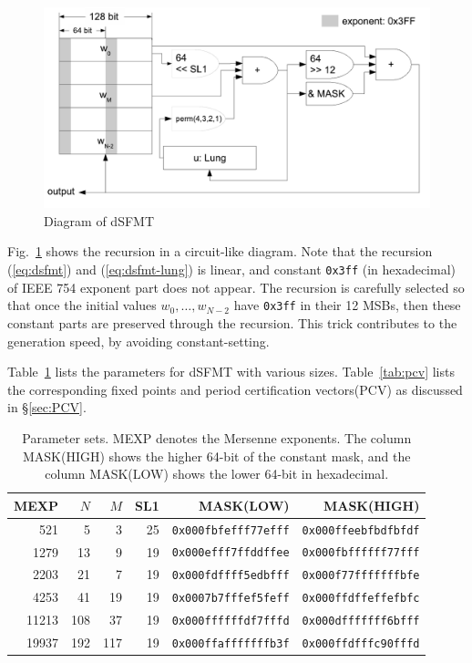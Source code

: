 \documentclass{svmult}
\begin{document}
\begin{figure}
  \centering
  \includegraphics[width=\linewidth]{Saito-fig.pdf}
  \caption{Diagram of dSFMT}
  \label{fig:dsfmt}
\end{figure}

Fig.~\ref{fig:dsfmt} shows the recursion in a circuit-like diagram.
Note that the recursion (\ref{eq:dsfmt}) and (\ref{eq:dsfmt-lung})
is linear, and constant \texttt{0x3ff} (in hexadecimal) of IEEE 754 exponent part
does not appear.
The recursion is carefully selected so that once
the initial values $w_0,\ldots , w_{N-2}$ have \texttt{0x3ff} in their 12 MSBs,
then these constant parts are preserved through the recursion. 
This trick contributes to the generation speed, by avoiding
constant-setting.

Table~\ref{tab:params} lists the parameters 
for dSFMT with various sizes.
Table~\ref{tab:pcv} lists the corresponding fixed points and period
certification vectors(PCV) as discussed in \S\ref{sec:PCV}.

\begin{table}
  \begin{center}
    \caption{Parameter sets. MEXP denotes the Mersenne exponents.
      The column MASK(HIGH) shows the higher
      64-bit of the constant mask, and the column MASK(LOW) shows
      the lower 64-bit in hexadecimal.}
    \label{tab:params}
    \begin{tabular}{rrrrrr} \hline
      MEXP & $N$ & $M$ & SL1 & MASK(LOW) & MASK(HIGH) \\ \hline \hline
      521 & 5 & 3 & 25 & \texttt{0x000fbfefff77efff} 
      & \texttt{0x000ffeebfbdfbfdf} \\
      1279 & 13 & 9 & 19 & \texttt{0x000efff7ffddffee} 
      & \texttt{0x000fbffffff77fff} \\
      2203 & 21 & 7 & 19 & \texttt{0x000fdffff5edbfff} 
      & \texttt{0x000f77fffffffbfe} \\
      4253 & 41 & 19 & 19 & \texttt{0x0007b7fffef5feff} 
      & \texttt{0x000ffdffeffefbfc} \\
      11213 & 108 & 37 & 19 & \texttt{0x000ffffffdf7fffd} 
      & \texttt{0x000dfffffff6bfff} \\
      19937 & 192 & 117 & 19 & \texttt{0x000ffafffffffb3f} 
      & \texttt{0x000ffdfffc90fffd} \\ \hline
    \end{tabular}
  \end{center}
\end{table}
\end{document}
